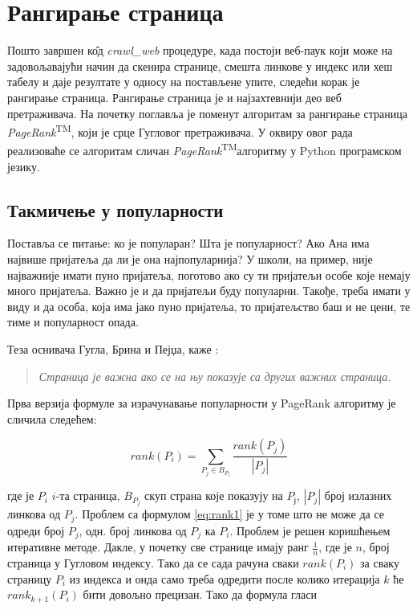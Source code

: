 \section{Рангирање страница}

Пошто завршен к\^{о}д \emph{crawl\_web} процедуре, када постоји веб-паук који може на задовољавајући начин да скенира странице, смешта линкове у индекс или хеш табелу и даје резултате у односу на постављене упите, следећи корак је рангирање страница. Рангирање страница је и најзахтевнији део веб претраживача. На почетку поглавља је поменут алгоритам за рангирање страница \emph{PageRank}\textsuperscript{TM}, који је срце Гугловог претраживача. У оквиру овог рада реализоваће се алгоритам сличан \emph{PageRank}\textsuperscript{TM}алгоритму у Python програмском језику.

\subsection{Такмичење у популарности}

Поставља се питање: ко је популаран? Шта је
популарност? Ако Ана има
највише пријатеља да ли је она најпопуларнија? У школи, на пример, није
најважније имати пуно пријатеља, поготово ако су ти пријатељи особе које немају
много пријатеља. Важно је и да пријатељи буду популарни. Такође, треба имати у
виду и да особа, која има јако пуно пријатеља, то пријатељство баш и не цени, те тиме и популарност опада.

Теза оснивача Гугла, Брина и Пејџа, каже \cite[Ch 4]{langville2011google}:

\begin{quote}
\textit{Страница је важна ако се на њу показује са других важних страница.}
\end{quote}

Прва верзија формуле за израчунавање популарности у PageRank алгоритму је сличила следећем:

\begin{equation}\label{eq:rank1}
rank(P_{i})=\sum_{P_{j}\in B_{P_{i}}}\frac{rank(P_{j})}{\left |P_{j}  \right |}
\end{equation}

где је $P_{i}$ $i$-та страница, $B_{P_{j}}$ скуп страна које показују на $P_{ј}$, $\left |P_{j}  \right |$ број излазних линкова од $P_{j}$. Проблем са формулом \ref{eq:rank1} је у томе што не може да се одреди број $P_{j}$, одн. број линкова од $P_{j}$ ка $P_{i}$. Проблем је решен коришћењем итеративне методе. Дакле, у почетку све странице имају ранг $\frac{1}{n}$, где је $n$, број страница у Гугловом индексу. Тако да се сада рачуна сваки $rank(P_{i})$ за сваку страницу $P_{i}$ из индекса и онда само треба одредити после колико итерација $k$ ће $rank_{k+1}(P_{i})$ бити довољно прецизан. Тако да формула гласи\cite[Ch 4.1]{langville2011google}

